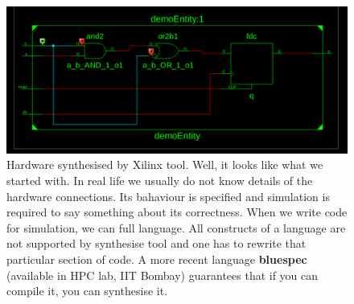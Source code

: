 \documentclass[a4paper,10pt]{article}
\begin{document}
  \begin{figure}[h]
    \centering
    \includegraphics[width=\textwidth]{./../GHDLDemo/Xilinx/bhav.png}
    \caption{Hardware synthesised by Xilinx tool. Well, it looks like what we
    started with. In real life we usually do not know details of the hardware
    connections. Its bahaviour is specified and simulation is required to say
    something about its correctness. When we write code for simulation, we can
    full language. All constructs of a language are not supported by synthesise
    tool and one has to rewrite that particular section of code. A more recent
    language \textbf{bluespec} (available in HPC lab, IIT Bombay) guarantees
    that if you can compile it, you can synthesise it. }
    \label{fig:synthesis}

  \end{figure}
\end{document}
